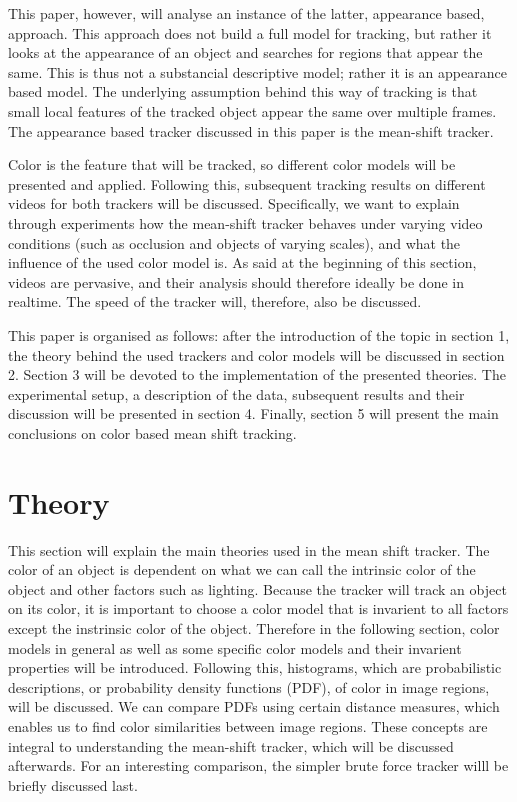 \documentclass[a4paper,11pt]{article}
\begin{document}
This paper, however, will analyse an instance of the latter, appearance based, approach. This approach does not build a full model for tracking, but rather it looks at the appearance of an object and searches for regions that appear the same.  This is thus not a substancial descriptive model; rather it is an appearance based model. The underlying assumption behind this way of tracking is that small local features of the tracked object appear the same over multiple frames. %
The appearance based tracker discussed in this paper is the mean-shift tracker. 

Color is the feature that will be tracked, so different color models will be presented and applied. Following this, subsequent tracking results on different videos for both trackers will be discussed. Specifically, we want to explain through experiments how the mean-shift tracker behaves under varying video conditions (such as occlusion and objects of varying scales), and what the influence of the used color model is.
	As said at the beginning of this section, videos are pervasive, and their analysis should therefore ideally be done in realtime. The speed of the tracker will, therefore, also be discussed. 
	
	This paper is organised as follows:  after the introduction of the topic in section 1, the theory behind the used trackers and color models will be discussed in section 2.
	Section 3 will be devoted to the implementation of the presented theories. The experimental setup, a description of the data, subsequent results and their discussion will be presented in section 4. 
	Finally, section 5 will present the main conclusions on color based mean shift tracking.

\section{Theory}	
	This section will explain the main theories used in the mean shift tracker. The color of an object is dependent on what we can call the intrinsic color of the object and other factors such as lighting. Because the tracker will track an object on its color, it is important to choose a color model that is invarient to all factors except the instrinsic color of the object. Therefore in the following section, color models in general as well as some specific color models and their invarient properties will be introduced. Following this, histograms, which are probabilistic descriptions, or probability density functions (PDF), of color in image regions, will be discussed. We can compare PDFs using certain distance measures, which enables us to find color similarities between image regions. These concepts are integral to understanding the mean-shift tracker, which will be discussed afterwards. For an interesting comparison, the simpler brute force tracker willl be briefly discussed last.  
\end{document}
